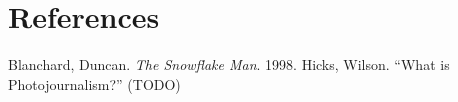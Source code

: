 \section*{References}

\bibent Blanchard, Duncan. \textit{The Snowflake Man}. 1998.
\bibent Hicks, Wilson. ``What is Photojournalism?'' (TODO)
